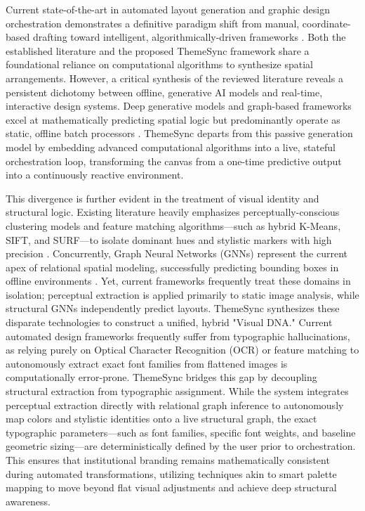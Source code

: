 \begin{refsection}
Current state-of-the-art in automated layout generation and graphic design orchestration demonstrates a definitive paradigm shift from manual, coordinate-based drafting toward intelligent, algorithmically-driven frameworks \cite{Kim2025Fragment, Sanchez2025Generative, Hurne2026Blueprint}. Both the established literature and the proposed ThemeSync framework share a foundational reliance on computational algorithms to synthesize spatial arrangements. However, a critical synthesis of the reviewed literature reveals a persistent dichotomy between offline, generative AI models and real-time, interactive design systems. Deep generative models and graph-based frameworks excel at mathematically predicting spatial logic but predominantly operate as static, offline batch processors \cite{Nauata2020HouseGAN, Nauata2021HouseGANPlus}. ThemeSync departs from this passive generation model by embedding advanced computational algorithms into a live, stateful orchestration loop, transforming the canvas from a one-time predictive output into a continuously reactive environment.

This divergence is further evident in the treatment of visual identity and structural logic. Existing literature heavily emphasizes perceptually-conscious clustering models and feature matching algorithms—such as hybrid K-Means, SIFT, and SURF—to isolate dominant hues and stylistic markers with high precision \cite{Garcia2023, Shaharom2023SIFT, Lertrusdachakul2025Hybrid}. Concurrently, Graph Neural Networks (GNNs) represent the current apex of relational spatial modeling, successfully predicting bounding boxes in offline environments \cite{Jiang2024Graph4GUI, Zhou2020Review}. Yet, current frameworks frequently treat these domains in isolation; perceptual extraction is applied primarily to static image analysis, while structural GNNs independently predict layouts. ThemeSync synthesizes these disparate technologies to construct a unified, hybrid "Visual DNA." Current automated design frameworks frequently suffer from typographic hallucinations, as relying purely on Optical Character Recognition (OCR) or feature matching to autonomously extract exact font families from flattened images is computationally error-prone. ThemeSync bridges this gap by decoupling structural extraction from typographic assignment. While the system integrates perceptual extraction directly with relational graph inference to autonomously map colors and stylistic identities onto a live structural graph, the exact typographic parameters—such as font families, specific font weights, and baseline geometric sizing—are deterministically defined by the user prior to orchestration. This ensures that institutional branding remains mathematically consistent during automated transformations, utilizing techniques akin to smart palette mapping \cite{Huang2025Recoloring} to move beyond flat visual adjustments and achieve deep structural awareness.


\end{refsection}
